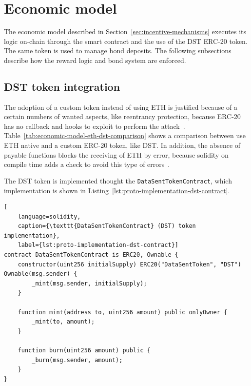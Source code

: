 \section{Economic model}\label{sec:implementation-economic-model}
The economic model described in Section~\ref{sec:incentive-mechanisms} executes its logic on-chain through the smart contract and the use of the DST ERC-20 token.
The same token is used to manage bond deposits.
The following subsections describe how the reward logic and bond system are enforced.

\subsection{DST token integration}\label{subsec:implementation-dst-integration}
The adoption of a custom token instead of using ETH is justified because of a certain numbers of wanted aspects, like reentrancy protection, because ERC-20 has no callback and hooks to exploit to perform the attack~\cite{eip20}.
Table~\ref{tab:economic-model-eth-dst-comparison} shows a comparison between use ETH native and a custom ERC-20 token, like DST.
In addition, the absence of payable functions blocks the receiving of ETH by error, because solidity on compile time adds a check to avoid this type of errors~\cite{solidity-abi-spec}.

The DST token is implemented thought the \texttt{DataSentTokenContract}, which implementation is shown in Listing~\ref{lst:proto-implementation-dst-contract}.

\begin{lstlisting}[
    language=solidity,
    caption={\texttt{DataSentTokenContract} (DST) token implementation},
    label={lst:proto-implementation-dst-contract}]
contract DataSentTokenContract is ERC20, Ownable {
    constructor(uint256 initialSupply) ERC20("DataSentToken", "DST") Ownable(msg.sender) {
        _mint(msg.sender, initialSupply);
    }

    function mint(address to, uint256 amount) public onlyOwner {
        _mint(to, amount);
    }

    function burn(uint256 amount) public {
        _burn(msg.sender, amount);
    }
}
\end{lstlisting}

